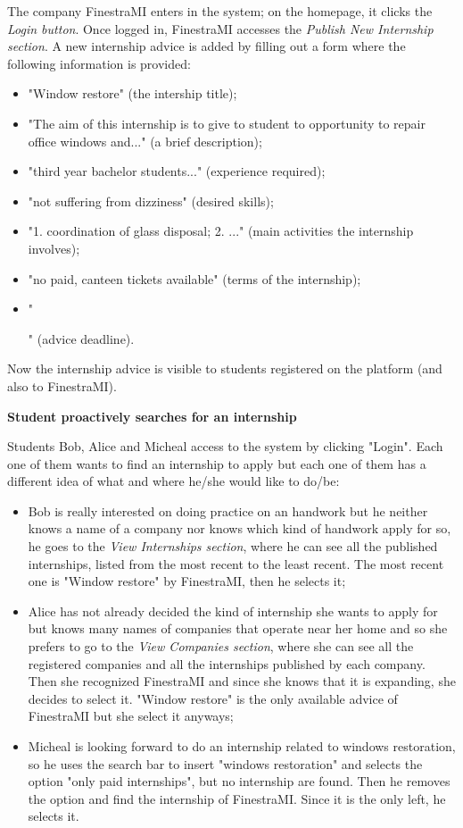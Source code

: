 		\begin{flushleft}
			The company FinestraMI enters in the system; on the homepage, it clicks the \emph{Login button}. Once logged in, FinestraMI accesses the \emph{Publish New Internship section}. A new internship advice is added by filling out a form where the following information is provided:
			\begin{itemize}
				\item "Window restore" (the intership title);
				\item "The aim of this internship is to give to student to opportunity to repair office windows and..." (a brief description);
				\item "third year bachelor students..." (experience required);
				\item "not suffering from dizziness" (desired skills);
				\item "1. coordination of glass disposal; 2. ..." (main activities the internship involves);
				\item "no paid, canteen tickets available" (terms of the internship);
				\item "\date{22/11/2024}" (advice deadline).
			\end{itemize}
			
			Now the internship advice is visible to students registered on the platform (and also to FinestraMI).
		\end{flushleft}
		\textbf{Student proactively searches for an internship}
		\begin{flushleft}
			Students Bob, Alice and Micheal access to the system by clicking "Login". Each one of them wants to find an internship to apply but each one of them has a different idea of what and where he/she would like to do/be:
			\begin{itemize}
				\item Bob is really interested on doing practice on an handwork but he neither knows a name of a company nor knows which kind of handwork apply for so, he goes to the \emph{View Internships section}, where he can see all the published internships, listed from the most recent to the least recent. The most recent one is "Window restore" by FinestraMI, then he selects it;
				\item Alice has not already decided the kind of internship she wants to apply for but knows many names of companies that operate near her home and so she prefers to go to the \emph{View Companies section}, where she can see all the registered companies and all the internships published by each company. Then she recognized FinestraMI and since she knows that it is expanding, she decides to select it. "Window restore" is the only available advice of FinestraMI but she select it anyways;
				\item Micheal is looking forward to do an internship related to windows restoration, so he uses the search bar to insert "windows restoration" and selects the option "only paid internships", but no internship are found. Then he removes the option and find the internship of FinestraMI. Since it is the only left, he selects it.
			\end{itemize} 
		\end{flushleft}
